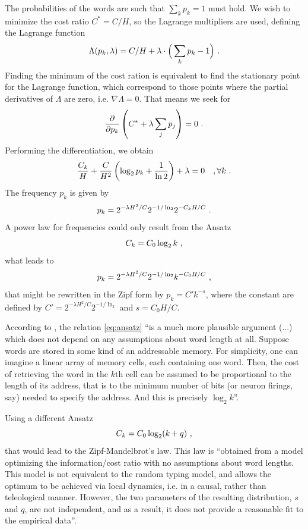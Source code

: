 The probabilities of the words are such that $\sum_k p_k = 1$ must hold.
We wish to minimize the cost ratio $C^\ast = C/H$, so the Lagrange 
multipliers are used, defining the Lagrange function 
\begin{equation}
\Lambda(p_k, \lambda) = C/H + \lambda \cdot \Big(\sum_k p_k - 1 \Big) \textmd{ .}
\end{equation}
Finding the minimum of the cost ration is equivalent to find the 
stationary point for the Lagrange function, which correspond
to those points where the partial derivatives of $\Lambda$ are zero, i.e. 
$\nabla \Lambda = 0$. That means we seek for
\begin{equation}
\frac{\partial}{\partial p_k} \left( C^\ast + \lambda \sum_j p_j \right) = 0 \textmd{ .}
\end{equation}
Performing the differentiation, we obtain
\begin{equation}
\frac{C_k}{H} + \frac{C}{H^2} \left( \log_2 p_k + \frac{1}{\ln 2}\right) + \lambda = 0 \quad , \forall k \textmd{ .}
\end{equation}
The frequency $p_k$ is given by
\begin{equation}
p_k = 2^{-\lambda H^2/C} 2^{- 1/ \ln_2} 2^{-C_k H /C} \textmd{ .}
\end{equation}
A power law for frequencies could only result from the Ansatz
\begin{equation}
\label{eq:ansatz}
C_k = C_0 \log_2 k \textmd{ ,}
\end{equation}
what leads to 
\begin{equation}
p_k = 2^{-\lambda H^2/C} 2^{- 1/ \ln_2} k^{-C_0 H/C} \textmd{ ,}
\end{equation}
that might be rewritten in the Zipf form by $p_k = C' k^{-s}$, where the constant are defined by 
$C' = 2^{-\lambda H^2/C} 2^{- 1/ \ln_2}$ and $s = C_0 H/C$.

According to \cite{manin2009}, the relation \ref{eq:ansatz} ``is a much more plausible argument
(...) which does not depend on any assumptions about word length at all.
Suppose words are stored in some kind of an
addressable memory. For simplicity, one can imagine a linear array of
memory cells, each containing one word. Then, the cost of retrieving the
word in the $k$th cell can be assumed to be proportional to the length of its
address, that is to the minimum number of bits (or neuron firings, say)
needed to specify the address. And this is precisely $\log_2 k$''\citep{manin2009}.

Using a different Ansatz
\begin{equation}
\label{eq:ansatz2}
C_k = C_0 \log_2 ( k + q) \textmd{ ,}
\end{equation}
that would lead to the Zipf-Mandelbrot's law.
This law is ``obtained from a model optimizing the information/cost ratio
with no assumptions about word lengths. This model is not equivalent to the random typing model, and
allows the optimum to be achieved via local dynamics, i.e. in a causal,
rather than teleological manner. However, the two parameters of the
resulting distribution, $s$ and $q$, are not independent, and as a result, it
does not provide a reasonable fit to the empirical data''\citep{manin2009}.


